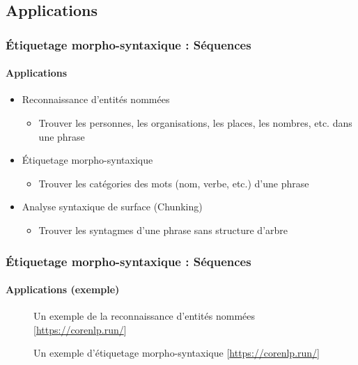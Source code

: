 \documentclass[xcolor=table]{beamer}
\begin{document}
\subsection{Applications}

\begin{frame}
\frametitle{Étiquetage morpho-syntaxique : Séquences}
\framesubtitle{Applications}

\begin{itemize}
	\item Reconnaissance d'entités nommées
	\begin{itemize}
		\item Trouver les personnes, les organisations, les places, les nombres, etc. dans une phrase
	\end{itemize}
	\item Étiquetage morpho-syntaxique
	\begin{itemize}
		\item Trouver les catégories des mots (nom, verbe, etc.) d'une phrase
	\end{itemize}
	\item Analyse syntaxique de surface (Chunking)
	\begin{itemize}
		\item Trouver les syntagmes d'une phrase sans structure d'arbre
	\end{itemize}
\end{itemize}


\end{frame}

\begin{frame}
\frametitle{Étiquetage morpho-syntaxique : Séquences}
\framesubtitle{Applications (exemple)}

\begin{figure}
	\centering
	\caption{Un exemple de la reconnaissance d'entités nommées [\url{https://corenlp.run/}]}
\end{figure}

\begin{figure}
	\centering
	\caption{Un exemple d'étiquetage morpho-syntaxique [\url{https://corenlp.run/}]}
\end{figure}

\end{frame}

%
%
%
\end{document}
